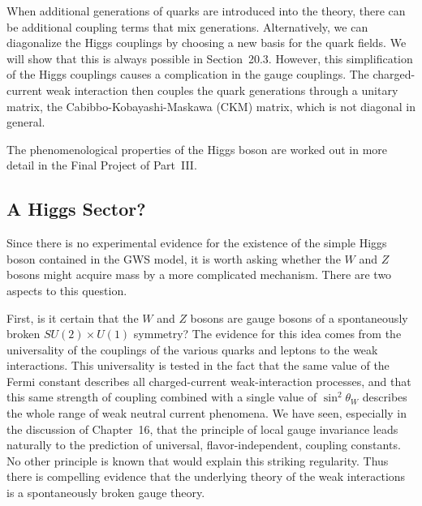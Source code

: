 When additional generations of quarks are introduced into the theory, there
can be additional coupling terms that mix generations.  Alternatively, we can
diagonalize the Higgs couplings by choosing a new basis for the quark fields.
We will show that this is always possible in Section~20.3.  However, this
simplification of the Higgs couplings causes a complication in the gauge
couplings.  The charged-current weak interaction then couples the quark
generations through a unitary matrix, the Cabibbo-Kobayashi-Maskawa (CKM)
matrix, which is not diagonal in general.

The phenomenological properties of the Higgs boson are worked out in more
detail in the Final Project of Part~III.

\subsection{A Higgs Sector?}

Since there is no experimental evidence for the existence of the simple Higgs
boson contained in the GWS model, it is worth asking whether the $W$ and $Z$
bosons might acquire mass by a more complicated mechanism.  There are two
aspects to this question.

First, is it certain that the $W$ and $Z$ bosons are gauge bosons of a
spontaneously broken $SU(2)\times U(1)$ symmetry?  The evidence for this idea
comes from the universality of the couplings of the various quarks and leptons
to the weak interactions.  This universality is tested in the fact that the
same value of the Fermi constant describes all charged-current
weak-interaction processes, and that this same strength of coupling combined
with a single value of $\sin^2\theta_W$ describes the whole range of weak
neutral current phenomena.  We have seen, especially in the discussion of
Chapter~16, that the principle of local gauge invariance leads naturally to
the prediction of universal, flavor-independent, coupling constants.  No
other principle is known that would explain this striking regularity.  Thus
there is compelling evidence that the underlying theory of the weak
interactions is a spontaneously broken gauge theory.

